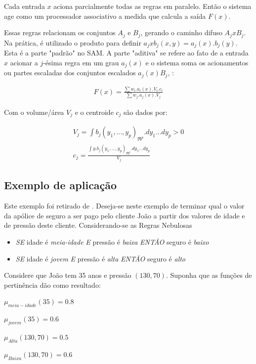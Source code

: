 Cada entrada $x$ aciona parcialmente todas as regras em paralelo. Então o sistema age como um processador 
associativo a medida que calcula a saída $F(x)$.

Essas regras relacionam os conjuntos $A_j$ e $B_j$, gerando o caminho difuso $A_j x B_j$. Na prática,
é utilizado o produto para definir $ a_j x b_j (x,y) = a_j(x).b_j(y)$. Esta é a parte "padrão" no SAM.
A parte "aditiva" se refere ao fato de a entrada $x$ acionar a $j$-ésima regra em um grau $a_j(x)$ e o sistema 
soma os acionamentos ou partes escaladas dos conjuntos escalados $a_j(x)B_j$, \cite{kosko1997fuzzy}:

\begin{eqnarray}
F(x) = \frac{\sum w_i.a_i(x).V_i.c_i}{\sum w_j.a_j(x).V_j}
\end{eqnarray}

Com o volume/área $V_j$ e o centroide $c_j$ são dados por:

\begin{eqnarray}
V_j = \int{b_j(y_1,...,y_p)}_{\Re^{p}}.dy_1...dy_p > 0\\
c_j = \frac{\int{y.b_j(y_1,...,y_p)}_{\Re^{p}}.dy_1...dy_p}{V_j}
\end{eqnarray}

\subsection{Exemplo de aplicação}
 Este exemplo foi retirado de \cite{passos2005datamining}. Deseja-se neste exemplo de terminar qual o valor da
 apólice de seguro a ser pago pelo cliente João a partir dos valores de idade e de pressão deste cliente.
 Considerando-se as Regras Nebulosas
 \begin{itemize}
   \item \emph{SE} idade é \textit{meia-idade} \emph{E} pressão é \textit{baixa} \emph{ENTÂO} seguro é \textit{baixo}
   \item \emph{SE} idade é \textit{jovem} \emph{E} pressão é \textit{alta} \emph{ENTÂO} seguro é \textit{alto}
 \end{itemize}
 
 Considere que João tem 35 anos e pressão $(130,70)$. Suponha que as funções de pertinência dão como resultado:
 \begin{description}
   \item $\mu_{meia-idade} (35) = 0.8$
   \item $\mu_{jovem} (35) = 0.6$
   \item $\mu_{Alta}(130,70) = 0.5$
   \item $\mu_{Baixa}(130,70) = 0.6$
 \end{description}
 
